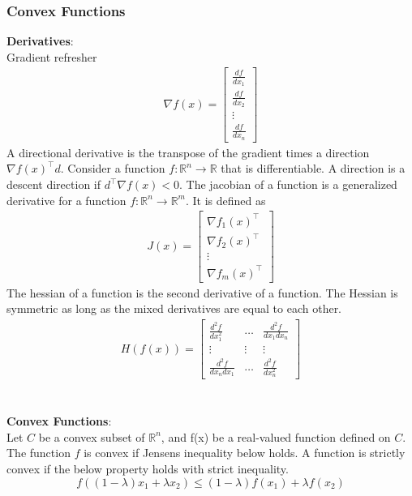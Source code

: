 \subsubsection{Convex Functions}
\textbf{Derivatives}: 
\\
Gradient refresher
\begin{align}
  \nabla f(x) = 
  \begin{bmatrix}
    \frac{d f}{d x_1} \\
    \frac{d f}{d x_2} \\ 
    \vdots \\
    \frac{d f}{d x_n}  
  \end{bmatrix}
\end{align}
A directional derivative is the transpose of the gradient times a direction $\nabla f(x)^\top d$. Consider a function $f : \mathbb{R}^n \to \mathbb{R}$ that is differentiable. A direction is a descent direction if $d^\top \nabla f(x) < 0$. The jacobian of a function is a generalized derivative for a function $f : \mathbb{R}^n \to \mathbb{R}^m$. It is defined as
\begin{align}
  J(x) = 
  \begin{bmatrix}
     \nabla f_1 (x)^\top \\
     \nabla f_2 (x)^\top \\
     \vdots \\
     \nabla f_m (x)^\top
  \end{bmatrix}
\end{align}
The hessian of a function is the second derivative of a function. The Hessian is symmetric as long as the mixed derivatives are equal to each other. 
\begin{align}
  H(f(x)) = 
  \begin{bmatrix}
     \frac{d^2 f}{d x_1^2} & \dots & \frac{d ^2 f}{d x_1 d x_n}   \\
     \vdots & \vdots & \vdots \\
     \frac{d^2 f}{d x_n d x_1} & \dots & \frac{d ^2 f}{d x_n^2}
  \end{bmatrix}
\end{align}
\\ \\
\textbf{Convex Functions}: 
\\
Let $C$ be a convex subset of $\mathbb{R}^n$, and f(x) be a real-valued function defined on $C$. The function $f$ is convex if Jensens inequality below holds. A function is strictly convex if the below property holds with strict inequality.
\begin{equation}
  f((1-\lambda)x_1 + \lambda x_2) \leq (1-\lambda) f(x_1) + \lambda f(x_2)
\end{equation}
